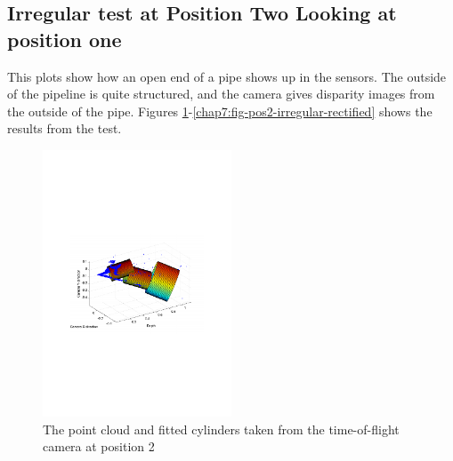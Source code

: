 \subsection{Irregular test at Position Two Looking at position one}
This plots show how an open end of a pipe shows up in the sensors. The outside of the
pipeline is quite structured, and the camera gives disparity images from the outside of
the pipe. Figures
\ref{chap7:fig-pos2-irregular-tof-3d}-\ref{chap7:fig-pos2-irregular-rectified} shows the
results from the test. 
\begin{figure}[htbp]
    \centering
    \includegraphics[width=0.5\textwidth]{pics/pos2-irregular-tof-3d}
    \caption{The point cloud and fitted cylinders taken from the time-of-flight camera at
    position 2}
    \label{chap7:fig-pos2-irregular-tof-3d}
\end{figure}
